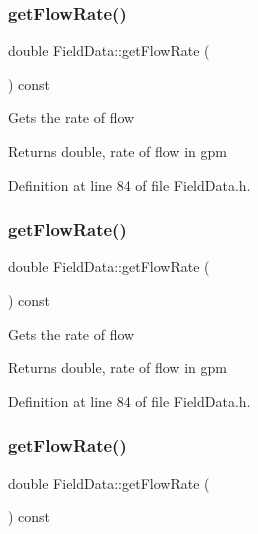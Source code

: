 \subsubsection{\texorpdfstring{get\+Flow\+Rate()}{getFlowRate()}\hspace{0.1cm}{\footnotesize\ttfamily [1/3]}}
{\footnotesize\ttfamily double Field\+Data\+::get\+Flow\+Rate (\begin{DoxyParamCaption}{ }\end{DoxyParamCaption}) const\hspace{0.3cm}{\ttfamily [inline]}}

Gets the rate of flow

\begin{DoxyReturn}{Returns}
double, rate of flow in gpm 
\end{DoxyReturn}


Definition at line 84 of file Field\+Data.\+h.

\mbox{\label{class_field_data_a59b3261a5162b002d7b73a2d35561bd0}} 
\subsubsection{\texorpdfstring{get\+Flow\+Rate()}{getFlowRate()}\hspace{0.1cm}{\footnotesize\ttfamily [2/3]}}
{\footnotesize\ttfamily double Field\+Data\+::get\+Flow\+Rate (\begin{DoxyParamCaption}{ }\end{DoxyParamCaption}) const\hspace{0.3cm}{\ttfamily [inline]}}

Gets the rate of flow

\begin{DoxyReturn}{Returns}
double, rate of flow in gpm 
\end{DoxyReturn}


Definition at line 84 of file Field\+Data.\+h.

\mbox{\label{class_field_data_a59b3261a5162b002d7b73a2d35561bd0}} 
\subsubsection{\texorpdfstring{get\+Flow\+Rate()}{getFlowRate()}\hspace{0.1cm}{\footnotesize\ttfamily [3/3]}}
{\footnotesize\ttfamily double Field\+Data\+::get\+Flow\+Rate (\begin{DoxyParamCaption}{ }\end{DoxyParamCaption}) const\hspace{0.3cm}{\ttfamily [inline]}}

